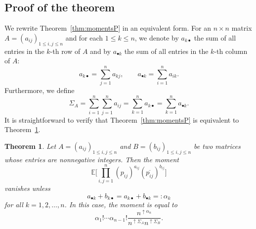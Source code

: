 \documentclass[pdftex]{sigma}
\numberwithin{equation}{section}
\newtheorem{Theorem}{Theorem}[section]
\theoremstyle{definition}
\begin{document}
\subsection{Proof of the theorem}

We rewrite Theorem~\ref{thm:momentsP} in an equivalent form.
For an $n \times n$ matrix $A=(a_{ij})_{1 \le i,j \le n}$ and for each $1 \le k \le n$,
we denote by $a_{k \bullet}$ the sum of all entries in the $k$-th row of $A$
and by $a_{\bullet k}$ the sum of all entries in the $k$-th column of $A$:
\[
a_{k \bullet} = \sum_{j=1}^n a_{kj}, \qquad a_{\bullet k} = \sum_{i=1}^n a_{ik}.
\]
Furthermore, we define
\[
\Sigma_A = \sum_{i=1}^n \sum_{j=1}^n a_{ij} = \sum_{k=1}^n a_{k \bullet} = \sum_{k=1}^n a_{\bullet k}.
\]
It is straightforward to verify that Theorem~\ref{thm:momentsP} is equivalent to Theorem~\ref{thm:momentsP2}.

\begin{Theorem} \label{thm:momentsP2}
Let $A=(a_{ij})_{1 \le i,j \le n}$ and $B=(b_{ij})_{1 \le i,j \le n}$ be two matrices whose entries are nonnegative integers.
Then the moment
\[
\mathbb{E} \Biggl[\prod_{i,j=1}^n (p_{ij})^{a_{ij}} (\overline{p_{ij}})^{b_{ij}} \Biggr]
\]
vanishes unless
\[
a_{\bullet k} + b_{k \bullet} = a_{k \bullet} + b_{\bullet k } =:\alpha_k
\]
for all $k=1,2,\dots, n$.
In this case, the moment is equal to
\[
 \alpha_1! \cdots \alpha_{n-1}!
\frac{n^{\uparrow \alpha_n}}{n^{\uparrow \Sigma_A} n^{\uparrow \Sigma_B}}.
\]
\end{Theorem}
\end{document}
